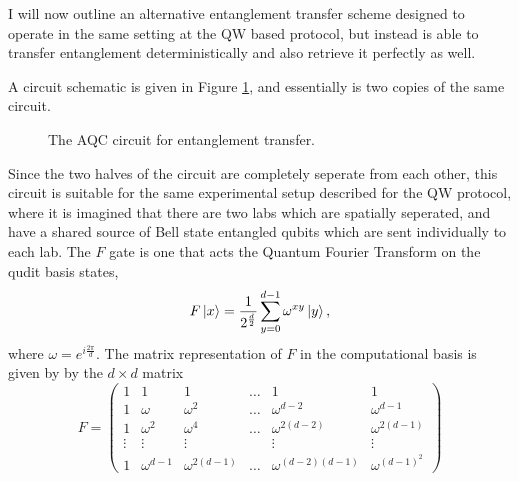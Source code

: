 I will now outline an alternative entanglement transfer scheme designed to operate in the same setting at the QW based protocol, but instead is able to transfer entanglement deterministically and also retrieve it perfectly as well.

A circuit schematic is given in Figure \ref{fig:aqc_circuit_schematic}, and essentially is two copies of the same circuit.

\begin{figure}[h]
    \begin{center}
    \caption{The AQC circuit for entanglement transfer.}
    \label{fig:aqc_circuit_schematic}
    \end{center}
\end{figure}
Since the two halves of the circuit are completely seperate from each other, this circuit is suitable for the same experimental setup described for the QW protocol, where it is imagined that there are two labs which are spatially seperated, and have a shared source of Bell state entangled qubits which are sent individually to each lab.
The $F$ gate is one that acts the Quantum Fourier Transform on the qudit basis states,
\begin{equation}
    F\ket{x} = \frac{1}{2^{\frac{d}{2}}} \sum_{y=0}^{d-1} \omega^{xy}\ket{y},
\end{equation}
where $\omega = e^{i\frac{2\pi}{d}}$. The matrix representation of $F$ in the computational basis is given by by the $d\times d$ matrix
\begin{equation}
    F = \begin{pmatrix}
        1 & 1 & 1 & \hdots & 1 & 1\\
        1 & \omega & \omega^2 & \hdots & \omega^{d-2} & \omega^{d-1}\\
        1 & \omega^2 & \omega^4 & \hdots & \omega^{2(d-2)} & \omega^{2(d-1)}\\
        \vdots & \vdots & \vdots & & \vdots & \vdots\\
        1 & \omega^{d-1} & \omega^{2(d-1)} & \hdots & \omega^{(d-2)(d-1)} & \omega^{(d-1)^2}
    \end{pmatrix}
\end{equation}

